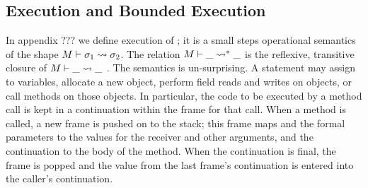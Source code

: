 \subsection{Execution and Bounded Execution}
 
In appendix ??? we  define execution  of \Loo{};
 it is a small steps operational semantics of the shape $M \vdash \sigma_1 \leadsto {\sigma_2}$. 
 The relation $M \vdash \_ \leadsto^* {\_}$  is the reflexive, transitive closure of $M \vdash \_ \leadsto {\_}$ .
The semantics is un-surprising. 
 A statement may assign to variables, allocate a new object, 
perform field reads and writes on objects,  or
 call methods on those objects. 
In particular, the code to be executed by a method call is kept in a continuation within the frame for that call. When a method is called, a new frame is pushed on to the stack; this frame  maps  and the formal parameters to  the values for the receiver and other arguments, and the continuation to the body of the method.  When the continuation is final, the frame is popped and the value from the last frame's continuation is entered into the caller's continuation. 



